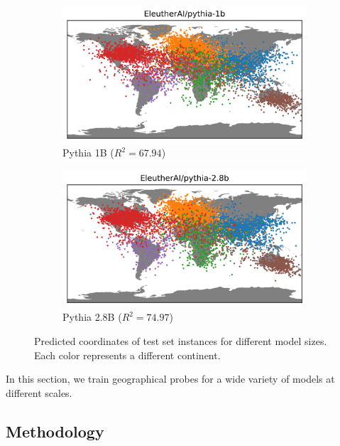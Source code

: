 \begin{figure}[h]
\begin{subfigure}[b]{0.43\textwidth}
         \includegraphics[trim={0 0 0 0.7cm},clip,width=\linewidth]{sources/part_1/geographical/imgs/pythia-1b.png}
         \caption{Pythia 1B ($R^2 = 67.94$)}
         \label{fig:1b_map}
    \end{subfigure}
    \begin{subfigure}[b]{0.43\textwidth}
         \includegraphics[trim={0 0 0 0.7cm},clip,width=\linewidth]{sources/part_1/geographical/imgs/pythia-2.8b.png}
         \caption{Pythia 2.8B ($R^2 = 74.97$)}
         \label{fig:2.8b_map}
    \end{subfigure}
    \caption{Predicted coordinates of test set instances for different model sizes. Each color represents a different continent.}
    \label{fig:maps}
\end{figure}

In this section, we train geographical probes for a wide variety of models at different scales.

\subsection{Methodology}

